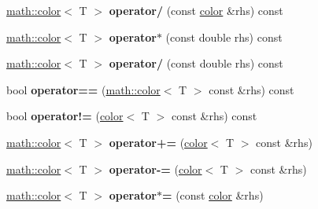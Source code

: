 \begin{DoxyCompactItemize}
\item 
\hypertarget{classmath_1_1color_a1a2e274c0bec51b579ddd0fccdb9b277}{
\hyperlink{classmath_1_1color}{math::color}$<$ T $>$ {\bfseries operator/} (const \hyperlink{classmath_1_1color}{color} \&rhs) const }
\label{classmath_1_1color_a1a2e274c0bec51b579ddd0fccdb9b277}

\item 
\hypertarget{classmath_1_1color_a5b878ee96b5c22574758838f397b1c14}{
\hyperlink{classmath_1_1color}{math::color}$<$ T $>$ {\bfseries operator$\ast$} (const double rhs) const }
\label{classmath_1_1color_a5b878ee96b5c22574758838f397b1c14}

\item 
\hypertarget{classmath_1_1color_ad84937a8c1a2de05a862ee1848c68296}{
\hyperlink{classmath_1_1color}{math::color}$<$ T $>$ {\bfseries operator/} (const double rhs) const }
\label{classmath_1_1color_ad84937a8c1a2de05a862ee1848c68296}

\item 
\hypertarget{classmath_1_1color_aa136e74f2b54511c47f3e608a8909332}{
bool {\bfseries operator==} (\hyperlink{classmath_1_1color}{math::color}$<$ T $>$ const \&rhs) const }
\label{classmath_1_1color_aa136e74f2b54511c47f3e608a8909332}

\item 
\hypertarget{classmath_1_1color_a6b6a34dc0a1c33fb2f16144e67eb7b69}{
bool {\bfseries operator!=} (\hyperlink{classmath_1_1color}{color}$<$ T $>$ const \&rhs) const }
\label{classmath_1_1color_a6b6a34dc0a1c33fb2f16144e67eb7b69}

\item 
\hypertarget{classmath_1_1color_a29f189934cca7a4dad41fd07edbb87a4}{
\hyperlink{classmath_1_1color}{math::color}$<$ T $>$ {\bfseries operator+=} (\hyperlink{classmath_1_1color}{color}$<$ T $>$ const \&rhs)}
\label{classmath_1_1color_a29f189934cca7a4dad41fd07edbb87a4}

\item 
\hypertarget{classmath_1_1color_a5a11bfeb7bad71cd23fbd174872cd89d}{
\hyperlink{classmath_1_1color}{math::color}$<$ T $>$ {\bfseries operator-\/=} (\hyperlink{classmath_1_1color}{color}$<$ T $>$ const \&rhs)}
\label{classmath_1_1color_a5a11bfeb7bad71cd23fbd174872cd89d}

\item 
\hypertarget{classmath_1_1color_a53036b9c2fcac4ccbf010060eba148eb}{
\hyperlink{classmath_1_1color}{math::color}$<$ T $>$ {\bfseries operator$\ast$=} (const \hyperlink{classmath_1_1color}{color} \&rhs)}
\label{classmath_1_1color_a53036b9c2fcac4ccbf010060eba148eb}


\end{DoxyCompactItemize}
